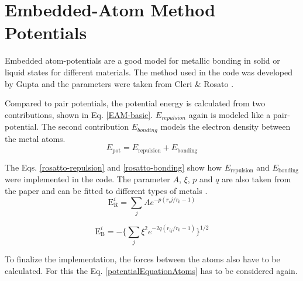 \section{Embedded-Atom Method Potentials}
\begin{comment}
- describe Units 
- better discribed in the course
- good model for metalic systems
- work with gold clusters 

\end{comment}
Embedded atom-potentials are a good model for metallic bonding in solid or liquid states for different materials. The method used in the code was developed by Gupta \cite{gupta} and the parameters were taken from  Cleri \& Rosato \cite{rosato}. 
\par 
\begin{comment}
pair potentials cant model crystals as they have 3 independet elastic constants
put pair potentials have only two -> cauchy pressure
rather heuristic description in the lecture, like basic chemistry
E_pot = E_repulsion + E_embedding (embedding energy is connected to electric density)
E_repulustion is typically a pair potential
E_emedding is a funtiunal of the density in r
\end{comment}
Compared to pair potentials, the potential energy is calculated from two contributions, shown in Eq. \ref{EAM-basic}. $E_{repulsion}$ again is modeled like a pair-potential. The second contribution $E_{bonding}$ models the electron density between the metal atoms. 
\begin{equation}
	\label{EAM-basic}
	E_{\mathrm{pot}}  = E_{\mathrm{repulsion}} + E_{\mathrm{bonding}}
\end{equation}
 
The Eqs. \ref{rosatto-repulsion} and \ref{rosatto-bonding} show how $E_{\mathrm{repulsion}}$ and $E_{\mathrm{bonding}}$ were implemented in the code. The parameter $A$,  $\xi$, $p$ and $q$ are also taken from the paper and can be fitted to different types of metals \cite{rosato}. 
\begin{equation}
 	\label{rosatto-repulsion}
 	\mathrm{E}_{\mathrm{R}}^{i} = \sum_{j} A e^{-p(r_ij/r_{0} - 1)}
 \end{equation}

\begin{equation}
	\label{rosatto-bonding}
	\mathrm{E}_{\mathrm{B}}^{i} = - \big\{\sum_{j}\xi^{2} e^{-2q(r_{ij}/r_{0}-1)} \big\}^{1/2}
\end{equation}

To finalize the implementation, the forces between the atoms also have to be calculated. For this the Eq. \ref{potentialEquationAtoms} has to be considered again. 
